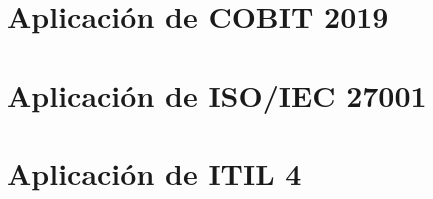 \section{Aplicación de COBIT 2019}

\section{Aplicación de ISO/IEC 27001}

\section{Aplicación de ITIL 4}
